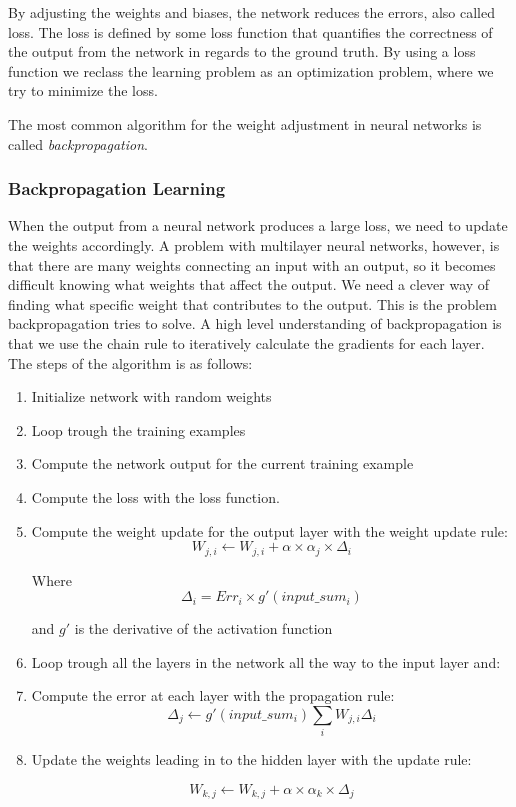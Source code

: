 By adjusting the weights and biases, the network reduces the errors, also called loss. The loss is defined by some loss function that quantifies the correctness of the output from the network in regards to the ground truth. By using a loss function we reclass the learning problem as an optimization problem, where we try to minimize the loss.

The most common algorithm for the weight adjustment in neural networks is called \emph{backpropagation}.


\subsubsection*{Backpropagation Learning}
When the output from a neural network produces a large loss, we need to update the weights accordingly. A problem with multilayer neural networks, however, is that there are many weights connecting an input with an output, so it becomes difficult knowing what weights that affect the output. We need a clever way of finding what specific weight that contributes to the output. This is the problem backpropagation tries to solve. A high level understanding of backpropagation is that we use the chain rule to iteratively calculate the gradients for each layer. The steps of the algorithm is as follows:

\begin{enumerate}
	\item Initialize network with random weights
	\item Loop trough the training examples
	\item Compute the network output for the current training example
	\item Compute the loss with the loss function.
	\item Compute the weight update for the output layer with the weight update rule:
	$$
		W_{j,i} \leftarrow W_{j,i} + \alpha \times \alpha_j \times \Delta_i
	$$
	
	Where 
	$$
		\Delta_i = Err_i \times g'(input\_sum_i)
	$$
	
	and $g'$ is the derivative of the activation function
	
	\item Loop trough all the layers in the network all the way to the input layer and:
	\item Compute the error at each layer with the propagation rule:
	$$ 
		\Delta_j \leftarrow g'(input\_sum_i)\sum_{i}W_{j,i}\Delta_i
	$$
	
	\item Update the weights leading in to the hidden layer with the update rule:
	
	$$ 
		W_{k,j} \leftarrow W_{k,j} + \alpha \times \alpha_k \times \Delta_j
	$$
	
\end{enumerate}

